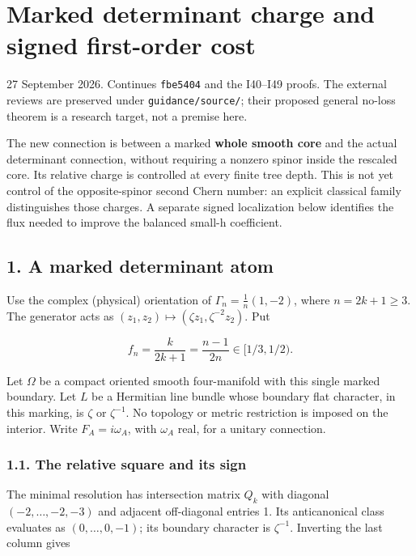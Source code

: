 \documentclass[
  11pt,
]{article}
\author{}
\date{}
\begin{document}
\hypertarget{marked-determinant-charge-and-signed-first-order-cost}{%
\section{Marked determinant charge and signed first-order
cost}\label{marked-determinant-charge-and-signed-first-order-cost}}

27 September 2026. Continues \texttt{fbe5404} and the I40--I49 proofs.
The external reviews are preserved under \texttt{guidance/source/};
their proposed general no-loss theorem is a research target, not a
premise here.

The new connection is between a marked \textbf{whole smooth core} and
the actual determinant connection, without requiring a nonzero spinor
inside the rescaled core. Its relative charge is controlled at every
finite tree depth. This is not yet control of the opposite-spinor second
Chern number: an explicit classical family distinguishes those charges.
A separate signed localization below identifies the flux needed to
improve the balanced small-h coefficient.

\hypertarget{a-marked-determinant-atom}{%
\subsection{1. A marked determinant
atom}\label{a-marked-determinant-atom}}

Use the complex (physical) orientation of \(\Gamma_n=\frac1n(1,-2)\),
where \(n=2k+1\ge3\). The generator acts as
\((z_1,z_2)\mapsto(\zeta z_1,\zeta^{-2}z_2)\). Put

\[
 f_n=\frac{k}{2k+1}=\frac{n-1}{2n}\in[1/3,1/2).
 \tag{1.1}
\]

Let \(\Omega\) be a compact oriented smooth four-manifold with this
single marked boundary. Let \(L\) be a Hermitian line bundle whose
boundary flat character, in this marking, is \(\zeta\) or
\(\zeta^{-1}\). No topology or metric restriction is imposed on the
interior. Write \(F_A=i\omega_A\), with \(\omega_A\) real, for a unitary
connection.

\hypertarget{the-relative-square-and-its-sign}{%
\subsubsection{1.1. The relative square and its
sign}\label{the-relative-square-and-its-sign}}

The minimal resolution has intersection matrix \(Q_k\) with diagonal
\((-2,\ldots,-2,-3)\) and adjacent off-diagonal entries 1. Its
anticanonical class evaluates as \((0,\ldots,0,-1)\); its boundary
character is \(\zeta^{-1}\). Inverting the last column gives
\end{document}

